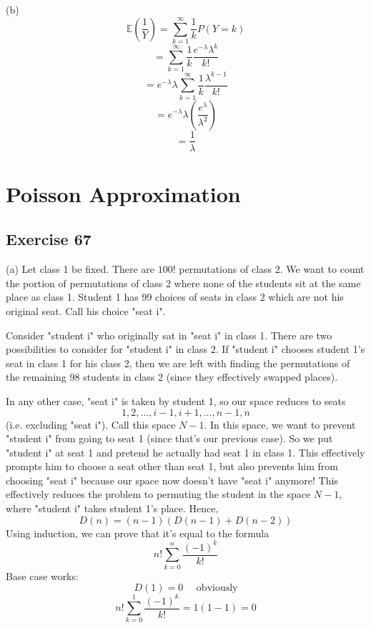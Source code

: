 \documentclass{book}
\begin{document}
\noindent
(b)
$$\mathbb{E}\left(\frac{1}{Y}\right) = \sum_{k = 1}^\infty \frac{1}{k} P(Y = k)$$
$$= \sum_{k = 1}^\infty \frac{1}{k} \frac{e^{-\lambda} \lambda^k}{k!}$$
$$= e^{-\lambda} \lambda \sum_{k = 1}^\infty \frac{1}{k} \frac{\lambda^{k - 1}}{k!}$$
$$= e^{-\lambda} \lambda \left(\frac{e^\lambda}{\lambda^2}\right)$$
$$= \frac{1}{\lambda}$$

\section{Poisson Approximation}

\subsection*{Exercise 67}
(a)
Let class 1 be fixed. There are $100!$ permutations of class 2. We want to count the portion of permutations of class 2 where none of the students sit at the same place as class 1. Student 1 has 99 choices of seats in class 2 which are not his original seat. Call his choice "seat i".

Consider "student i" who originally sat in "seat i" in class 1. There are two possibilities to consider for "student i" in class 2. If "student i" chooses student 1's seat in class 1 for his class 2, then we are left with finding the permutations of the remaining 98 students in class 2 (since they effectively swapped places).

In any other case, "seat i" is taken by student 1, so our space reduces to seats
$$1, 2, \ldots, i - 1, i + 1, \ldots, n - 1, n$$
(i.e. excluding "seat i"). Call this space $N - 1$. In this space, we want to prevent "student i" from going to seat 1 (since that's our previous case). So we put "student i" at seat 1 and pretend he actually had seat 1 in class 1. This effectively prompts him to choose a seat other than seat 1, but also prevents him from choosing "seat i" because our space now doesn't have "seat i" anymore! This effectively reduces the problem to permuting the student in the space $N - 1$, where "student i" takes student 1's place. Hence,
$$D(n) = (n - 1)(D(n - 1) + D(n - 2))$$
Using induction, we can prove that it's equal to the formula
$$n! \sum_{k = 0}^n \frac{(-1)^k}{k!}$$
Base case works:
$$D(1) = 0 \quad \text{ obviously}$$
$$n! \sum_{k = 0}^1 \frac{(-1)^k}{k!} = 1(1 - 1) = 0$$
\end{document}
